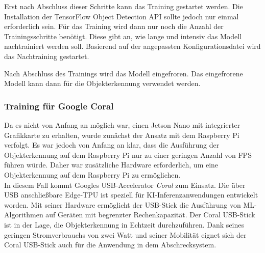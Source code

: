 Erst nach Abschluss dieser Schritte kann das Training gestartet werden. Die Installation der TensorFlow Object Detection API sollte jedoch nur einmal erforderlich sein. Für das Training wird dann nur noch die Anzahl der Trainingsschritte benötigt. Diese gibt an, wie lange und intensiv das Modell nachtrainiert werden soll. Basierend auf der angepassten Konfigurationsdatei wird das Nachtraining gestartet.

Nach Abschluss des Trainings wird das Modell eingefroren. Das eingefrorene Modell kann dann für die Objekterkennung verwendet werden.

\subsubsection{Training für Google Coral} \label{cap:coral_train}

Da es nicht von Anfang an möglich war, einen Jetson Nano mit integrierter Grafikkarte zu erhalten, wurde zunächst der Ansatz mit dem Raspberry Pi verfolgt. Es war jedoch von Anfang an klar, dass die Ausführung der Objekterkennung auf dem Raspberry Pi nur zu einer geringen Anzahl von FPS führen würde. Daher war zusätzliche Hardware erforderlich, um eine Objekterkennung auf dem Raspberry Pi zu ermöglichen.
\\
In diesem Fall kommt Googles USB-Accelerator \textit{Coral} zum Einsatz. Die über USB anschließbare Edge-TPU ist speziell für KI-Inferenzanwendungen entwickelt worden. Mit seiner Hardware ermöglicht der USB-Stick die Ausführung von \ac{ML}-Algorithmen auf Geräten mit begrenzter Rechenkapazität. Der Coral USB-Stick ist in der Lage, die Objekterkennung in Echtzeit durchzuführen. Dank seines geringen Stromverbrauchs von zwei Watt und seiner Mobilität eignet sich der Coral USB-Stick auch für die Anwendung in dem Abschrecksystem. \cite{coral_google}

